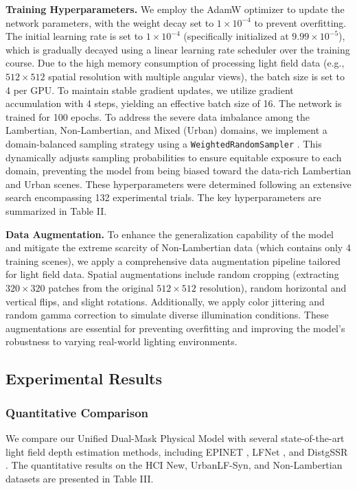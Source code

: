 \documentclass[lettersize,journal]{IEEEtran}
\begin{document}
\textbf{Training Hyperparameters.} 
We employ the AdamW optimizer to update the network parameters, with the weight decay set to $1 \times 10^{-4}$ to prevent overfitting. The initial learning rate is set to $1 \times 10^{-4}$ (specifically initialized at $9.99 \times 10^{-5}$), which is gradually decayed using a linear learning rate scheduler over the training course. Due to the high memory consumption of processing light field data (e.g., $512 \times 512$ spatial resolution with multiple angular views), the batch size is set to 4 per GPU. To maintain stable gradient updates, we utilize gradient accumulation with 4 steps, yielding an effective batch size of 16. The network is trained for 100 epochs. To address the severe data imbalance among the Lambertian, Non-Lambertian, and Mixed (Urban) domains, we implement a domain-balanced sampling strategy using a \texttt{WeightedRandomSampler} \cite{ref}. This dynamically adjusts sampling probabilities to ensure equitable exposure to each domain, preventing the model from being biased toward the data-rich Lambertian and Urban scenes. These hyperparameters were determined following an extensive search encompassing 132 experimental trials. The key hyperparameters are summarized in Table II.

\textbf{Data Augmentation.} 
To enhance the generalization capability of the model and mitigate the extreme scarcity of Non-Lambertian data (which contains only 4 training scenes), we apply a comprehensive data augmentation pipeline tailored for light field data. Spatial augmentations include random cropping (extracting $320 \times 320$ patches from the original $512 \times 512$ resolution), random horizontal and vertical flips, and slight rotations. Additionally, we apply color jittering and random gamma correction to simulate diverse illumination conditions. These augmentations are essential for preventing overfitting and improving the model's robustness to varying real-world lighting environments.

\subsection{Experimental Results}

\subsubsection{Quantitative Comparison}
We compare our Unified Dual-Mask Physical Model with several state-of-the-art light field depth estimation methods, including EPINET \cite{ref}, LFNet \cite{ref}, and DistgSSR \cite{ref}. The quantitative results on the HCI New, UrbanLF-Syn, and Non-Lambertian datasets are presented in Table III.
\end{document}
